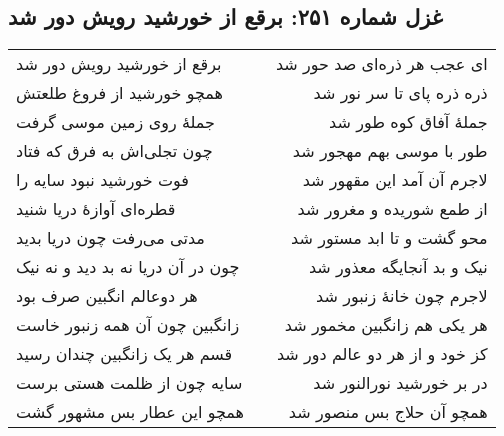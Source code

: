 \begin{center}
\section*{غزل شماره ۲۵۱: برقع از خورشید رویش دور شد}
\label{sec:251}
\begin{longtable}{l p{0.5cm} r}
برقع از خورشید رویش دور شد
&&
ای عجب هر ذره‌ای صد حور شد
\\
همچو خورشید از فروغ طلعتش
&&
ذره ذره پای تا سر نور شد
\\
جملهٔ روی زمین موسی گرفت
&&
جملهٔ آفاق کوه طور شد
\\
چون تجلی‌اش به فرق که فتاد
&&
طور با موسی بهم مهجور شد
\\
فوت خورشید نبود سایه را
&&
لاجرم آن آمد این مقهور شد
\\
قطره‌ای آوازهٔ دریا شنید
&&
از طمع شوریده و مغرور شد
\\
مدتی می‌رفت چون دریا بدید
&&
محو گشت و تا ابد مستور شد
\\
چون در آن دریا نه بد دید و نه نیک
&&
نیک و بد آنجایگه معذور شد
\\
هر دوعالم انگبین صرف بود
&&
لاجرم چون خانهٔ زنبور شد
\\
زانگبین چون آن همه زنبور خاست
&&
هر یکی هم زانگبین مخمور شد
\\
قسم هر یک زانگبین چندان رسید
&&
کز خود و از هر دو عالم دور شد
\\
سایه چون از ظلمت هستی برست
&&
در بر خورشید نورالنور شد
\\
همچو این عطار بس مشهور گشت
&&
همچو آن حلاج بس منصور شد
\\
\end{longtable}
\end{center}
